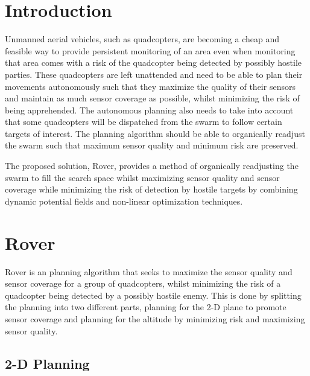 \documentclass[12pt]{article}
\begin{document}
\maketitle

\newpage



\section{Introduction}

Unmanned aerial vehicles, such as quadcopters, are becoming a cheap and
feasible way to provide persistent monitoring of an area even when monitoring
that area comes with a risk of the quadcopter being detected by possibly
hostile parties. These quadcopters are left unattended and need to be able to
plan their movements autonomously such that they maximize the quality of their
sensors and maintain as much sensor coverage as possible, whilst minimizing the
risk of being apprehended. The autonomous planning also needs to take into
account that some quadcopters will be dispatched from the swarm to follow
certain targets of interest. The planning algorithm should be able to
organically readjust the swarm such that maximum sensor quality and minimum
risk are preserved.

The proposed solution, Rover, provides a method of organically readjusting the
swarm to fill the search space whilst maximizing sensor quality and sensor
coverage while minimizing the risk of detection by hostile targets by combining
dynamic potential fields and non-linear optimization techniques.

\section{Rover}

Rover is an planning algorithm that seeks to maximize the sensor quality and
sensor coverage for a group of quadcopters, whilst minimizing the risk of a
quadcopter being detected by a possibly hostile enemy. This is done by
splitting the planning into two different parts, planning for the 2-D plane to
promote sensor coverage and planning for the altitude by minimizing risk and
maximizing sensor quality.

\subsection{2-D Planning}
\end{document}
